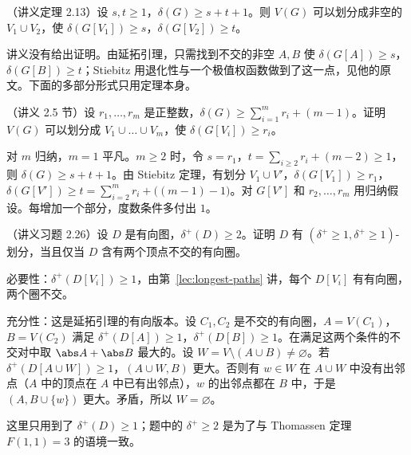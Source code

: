 \begin{theorem}[Stiebitz]\label{thm:partitions:stiebitz}
（讲义定理 2.13）设 $s,t\geqslant1$，$\delta(G)\geqslant s+t+1$。则 $V(G)$ 可以划分成非空的 $V_1\cup V_2$，使 $\delta(G[V_1])\geqslant s$，$\delta(G[V_2])\geqslant t$。
\end{theorem}

讲义没有给出证明。由延拓引理，只需找到不交的非空 $A,B$ 使 $\delta(G[A])\geqslant s$，$\delta(G[B])\geqslant t$；Stiebitz 用退化性与一个极值权函数做到了这一点，见他的原文。下面的多部分形式只用定理本身。

\begin{workedexample}\label{we:partitions:many-parts}
（讲义 2.5 节）设 $r_1,\dots,r_m$ 是正整数，$\delta(G)\geqslant\sum_{i=1}^mr_i+(m-1)$。证明 $V(G)$ 可以划分成 $V_1\cup\dots\cup V_m$，使 $\delta(G[V_i])\geqslant r_i$。
\end{workedexample}
\begin{solution}
对 $m$ 归纳，$m=1$ 平凡。$m\geqslant2$ 时，令 $s=r_1$，$t=\sum_{i\geqslant2}r_i+(m-2)\geqslant1$，则 $\delta(G)\geqslant s+t+1$。由 Stiebitz 定理，有划分 $V_1\cup V'$，$\delta(G[V_1])\geqslant r_1$，$\delta(G[V'])\geqslant t=\sum_{i=2}^mr_i+\bigl((m-1)-1\bigr)$。对 $G[V']$ 和 $r_2,\dots,r_m$ 用归纳假设。每增加一个部分，度数条件多付出 $1$。
\end{solution}

\begin{workedexample}\label{we:partitions:digraph}
（讲义习题 2.26）设 $D$ 是有向图，$\delta^+(D)\geqslant2$。证明 $D$ 有 $(\delta^+\geqslant1,\delta^+\geqslant1)$-划分，当且仅当 $D$ 含有两个顶点不交的有向圈。
\end{workedexample}
\begin{solution}
必要性：$\delta^+(D[V_i])\geqslant1$，由第~\ref{lec:longest-paths} 讲，每个 $D[V_i]$ 有有向圈，两个圈不交。

充分性：这是延拓引理的有向版本。设 $C_1,C_2$ 是不交的有向圈，$A=V(C_1)$，$B=V(C_2)$ 满足 $\delta^+(D[A])\geqslant1$，$\delta^+(D[B])\geqslant1$。在满足这两个条件的不交对中取 $\abs A+\abs B$ 最大的。设 $W=V\setminus(A\cup B)\neq\varnothing$。若 $\delta^+(D[A\cup W])\geqslant1$，$(A\cup W,B)$ 更大。否则有 $w\in W$ 在 $A\cup W$ 中没有出邻点（$A$ 中的顶点在 $A$ 中已有出邻点），$w$ 的出邻点都在 $B$ 中，于是 $(A,B\cup\{w\})$ 更大。矛盾，所以 $W=\varnothing$。

这里只用到了 $\delta^+(D)\geqslant1$；题中的 $\delta^+\geqslant2$ 是为了与 Thomassen 定理 $F(1,1)=3$ 的语境一致。
\end{solution}

